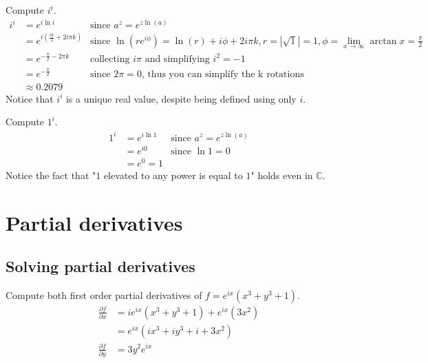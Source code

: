   Compute $i^i$.
  \begin{align*}
    i^i & = e^{i\ln i}
        & \text{since } a^z = e^{z\ln(a)} \\
        & = e^{i\left(\frac{i\pi}{2} + 2i\pi k\right)}
        & \text{since } \ln(re^{i\phi}) = \ln(r) + i\phi + 2i\pi k, 
                        r = |\sqrt1| = 1, 
                        \phi = \lim_{x \to \infty}\arctan{x} = \frac{\pi}{2} \\
        & = e^{-\frac{\pi}{2}-2\pi k}
        & \text{collecting } i\pi \text{ and simplifying } i^2 = -1 \\
        & = e^{-\frac{\pi}{2}}
        & \text{since } 2\pi = 0 \text{, thus you can simplify the k rotations} \\
        & \approx 0.2079
  \end{align*}
  Notice that $i^i$ is a unique real value, despite being defined using only $i$.

  Compute $1^i$.
  \begin{align*}
    1^i & = e^{i\ln 1}
        & \text{since } a^z = e^{z\ln(a)} \\
        & = e^{i0}
        & \text{since } \ln1 = 0 \\
        & = e^{0} = 1
  \end{align*}
  Notice the fact that "$1$ elevated to any power is equal to $1$" holds even in $\mathbb{C}$.


\section{Partial derivatives}

  \subsection{Solving partial derivatives}
  Compute both first order partial derivatives of $f = e^{ix}(x^3 + y^3 + 1)$.
  \begin{align*}
    \frac{\partial f}{\partial x} & = ie^{ix}(x^3 + y^3 + 1) + e^{ix}(3x^2) \\
                                  & = e^{ix}(ix^3 + iy^3 + i + 3x^2) \\
    \frac{\partial f}{\partial y} & = 3y^2e^{ix} \\
  \end{align*}

